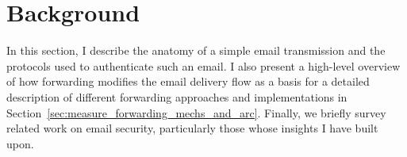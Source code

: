 
\section{Background}
\label{sec:background}

In this section, I describe the anatomy of a simple email
transmission and the protocols used to authenticate such an email.
I also present a high-level overview of how forwarding modifies the
email delivery flow as a basis for a detailed description of
different forwarding approaches and implementations in
Section~\ref{sec:measure_forwarding_mechs_and_arc}.  Finally, we
briefly survey related work on email security, particularly
those whose insights I have built upon.

